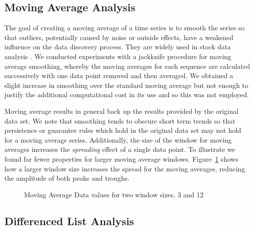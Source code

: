 \subsection{Moving Average Analysis}\label{subsec:tr_mav_analysis}

The goal of creating a moving average of a time series is to smooth
the series so that outliers, potentially caused by noise or outside
effects, have a weakened influence on the data discovery
process. They are widely used in stock data analysis \cite{rm97}.
 We conducted experiments with a jackknife procedure for moving
average smoothing, 
whereby the moving averages for each sequence are calculated
successively with one data point removed and then averaged. We obtained a
slight increase in smoothing over the standard moving average but not
enough to justify the additional computational cost in its use and so
this was not employed. 

\smallskip

Moving average results in general back up the results provided by the
original data set. We note that smoothing tends to obscure short
term trends so that persistence or guarantee rules which hold in the
original data set may not hold for a moving average
series. Additionally, the size of the window for moving 
averages increases the {\em spreading} effect of a single data
point. To illustrate we found far fewer properties for larger moving
average windows. Figure~\ref{graph:ma3_12} shows how a larger window
size increases the spread for the moving averages, reducing the
amplitude of both peaks and troughs.


\begin{figure}
\centerline{}
\caption{\label{graph:ma3_12}{Moving Average Data
values for two window sizes, 3 and 12}}
\end{figure}


\subsection{Differenced List Analysis}\label{subsec:tr__diff_analysis}

